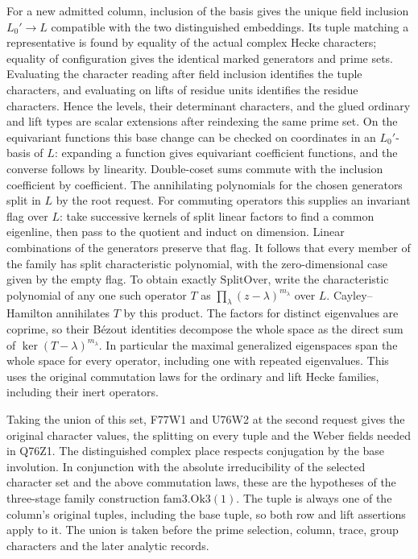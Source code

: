 For a new admitted column, inclusion of the basis gives the unique
field inclusion $L_0'\to L$ compatible with the two distinguished
embeddings. Its tuple matching a representative is found by equality
of the actual complex Hecke characters; equality of configuration
gives the identical marked generators and prime sets. Evaluating
the character reading after field inclusion identifies the tuple
characters, and evaluating on lifts of residue units identifies the
residue characters. Hence the levels, their determinant characters,
and the glued ordinary and lift types are scalar extensions after
reindexing the same prime set. On the equivariant functions this
base change can be checked on coordinates in an $L_0'$-basis of
$L$: expanding a function gives equivariant coefficient functions,
and the converse follows by linearity. Double-coset sums commute
with the inclusion coefficient by coefficient. The annihilating
polynomials for the chosen generators split in $L$ by the root
request. For commuting operators this supplies an invariant flag
over $L$: take successive kernels of split linear factors to find
a common eigenline, then pass to the quotient and induct on
dimension. Linear combinations of the generators preserve that
flag. It follows that every member of the family has split
characteristic polynomial, with the zero-dimensional case given
by the empty flag. To obtain exactly $\mathrm{SplitOver}$, write
the characteristic polynomial of any one such operator $T$ as
$\prod_\lambda (z-\lambda)^{m_\lambda}$ over $L$. Cayley--Hamilton
annihilates $T$ by this product. The factors for distinct eigenvalues
are coprime, so their B\'ezout identities decompose the whole space
as the direct sum of $\ker(T-\lambda)^{m_\lambda}$. In particular
the maximal generalized eigenspaces span the whole space for every
operator, including one with repeated eigenvalues. This uses the
original commutation laws for the ordinary and lift Hecke families,
including their inert operators.

Taking the union of this set, F77W1 and U76W2 at the second request
gives the original character values, the splitting on every tuple
and the Weber fields needed in Q76Z1. The distinguished complex
place respects conjugation by the base involution. In conjunction
with the absolute irreducibility of the selected character set and
the above commutation laws, these are the hypotheses of the
three-stage family construction $\mathrm{fam3.Ok3}(1)$.
The tuple is always one of the column's original tuples, including
the base tuple, so both row and lift assertions apply to it.
The union is taken before the prime selection, column, trace, group
characters and the later analytic records.
